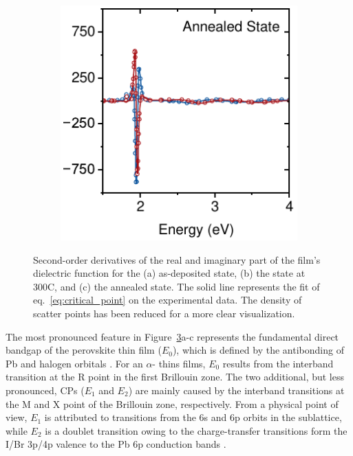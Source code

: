 \begin{figure}[htbp]
\begin{subfigure}{0.31\textwidth}
        \caption{}
        \label{fig:ellipsometry:deriv:300}
    \end{subfigure}
    \hfill
    \begin{subfigure}{0.31\textwidth}
        \includegraphics[width=\textwidth]{chapters/ellipsometry/image/Deriv_Anneal.pdf}
        \caption{}
        \label{fig:ellipsometry:deriv:anneal}
    \end{subfigure}
    \caption{Second-order derivatives of the real and imaginary part of the film's dielectric function for the (a) as-deposited state, (b) the state at 300\degree C, and (c) the annealed state. The solid line represents the fit of eq.~\ref{eq:critical_point} on the experimental data. The density of scatter points has been reduced for a more clear visualization.}
    \label{fig:ellipsometry:deriv}
\end{figure}


The most pronounced feature in Figure~\ref{fig:ellipsometry:deriv}a-c represents the fundamental direct bandgap of the perovskite thin film ($E_0$), which is defined by the antibonding of Pb and halogen orbitals \cite{Mannino2020Temperature-DependentCrystals}. For an $\alpha$- thins films, $E_0$ results from the interband transition at the R point in the first Brillouin zone. The two additional, but less pronounced, CPs ($E_1$ and $E_2$) are mainly caused by the interband transitions at the M and X point of the Brillouin zone, respectively. From a physical point of view, $E_1$ is attributed to transitions from the 6s and 6p orbits in the  sublattice, while $E_2$ is a doublet transition owing to the charge-transfer transitions form the I/Br 3p/4p valence to the Pb 6p conduction bands \cite{Zhao2018EllipsometricFilm}.   


